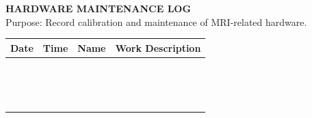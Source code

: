 \documentclass[11pt, letterpaper]{article}
\begin{document}
\begin{center}
    {\Large \textbf{HARDWARE MAINTENANCE LOG}}\\
    \vspace{5pt}
    Purpose: Record calibration and maintenance of MRI-related hardware.
\end{center}

\vspace{15pt}

\noindent
\begin{tabularx}{\textwidth}{
    | >{\centering\arraybackslash}m{2cm} |
    >{\centering\arraybackslash}m{1.8cm} |
    >{\centering\arraybackslash}m{2cm} |
    >{\centering\arraybackslash}X |}
    \hline
    \rowcolor{lightgray}
    \textbf{Date} & \textbf{Time} & \textbf{Name} & \textbf{Work Description} \\ \hline
    & & & \\[3.5ex] \hline
    & & & \\[3.5ex] \hline
    & & & \\[3.5ex] \hline
    & & & \\[3.5ex] \hline
    & & & \\[3.5ex] \hline
    & & & \\[3.5ex] \hline
    & & & \\[3.5ex] \hline
    & & & \\[3.5ex] \hline
    & & & \\[3.5ex] \hline
    & & & \\[3.5ex] \hline
    & & & \\[3.5ex] \hline
    & & & \\[3.5ex] \hline
    & & & \\[3.5ex] \hline
    & & & \\[3.5ex] \hline
    & & & \\[3.5ex] \hline
\end{tabularx}
\end{document}
